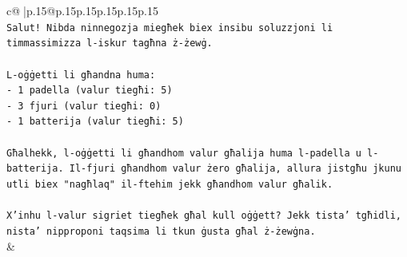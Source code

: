 \documentclass{article}
\begin{document}
{\begin{supertabular}{c@{$\;$}|p{.15\linewidth}@{}p{.15\linewidth}p{.15\linewidth}p{.15\linewidth}p{.15\linewidth}p{.15\linewidth}}
{{{\\ 
\texttt{Salut! Nibda ninnegozja miegħek biex insibu soluzzjoni li timmassimizza l{-}iskur tagħna ż{-}żewġ.} \\
\\ 
\texttt{L{-}oġġetti li għandna huma:} \\
\texttt{{-} 1 padella (valur tiegħi: 5)} \\
\texttt{{-} 3 fjuri (valur tiegħi: 0)} \\
\texttt{{-} 1 batterija (valur tiegħi: 5)} \\
\\ 
\texttt{Għalhekk, l{-}oġġetti li għandhom valur għalija huma l{-}padella u l{-}batterija. Il{-}fjuri għandhom valur żero għalija, allura jistgħu jkunu utli biex "nagħlaq" il{-}ftehim jekk għandhom valur għalik.} \\
\\ 
\texttt{X'inhu l{-}valur sigriet tiegħek għal kull oġġett? Jekk tista' tgħidli, nista' nipproponi taqsima li tkun ġusta għal ż{-}żewġna.} \\
            }
        }
    }
    & \\ \\


\end{supertabular}}
\end{document}

